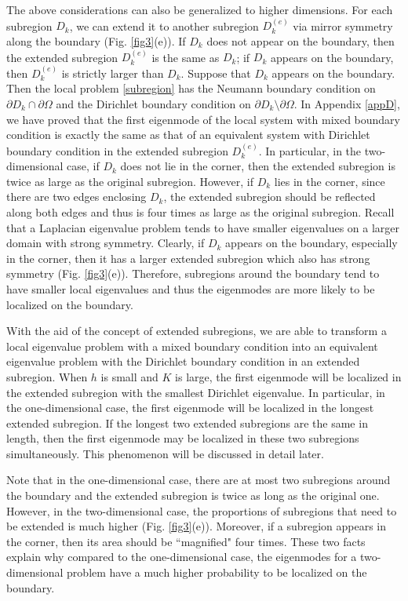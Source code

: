 \documentclass[a4paper,11pt]{article}
\begin{document}
The above considerations can also be generalized to higher dimensions. For each subregion $D_k$, we can extend it to another subregion $D_k^{(e)}$ via mirror symmetry along the boundary (Fig. \ref{fig3}(e)). If $D_k$ does not appear on the boundary, then the extended subregion $D_k^{(e)}$ is the same as $D_k$; if $D_k$ appears on the boundary, then $D_k^{(e)}$ is strictly larger than $D_k$. Suppose that $D_k$ appears on the boundary. Then the local problem \eqref{subregion} has the Neumann boundary condition on $\partial D_k \cap \partial \Omega$ and the Dirichlet boundary condition on $\partial D_k \setminus \partial \Omega$. In Appendix \ref{appD}, we have proved that the first eigenmode of the local system with mixed boundary condition is exactly the same as that of an equivalent system with Dirichlet boundary condition in the extended subregion $D_k^{(e)}$. In particular, in the two-dimensional case, if $D_k$ does not lie in the corner, then the extended subregion is twice as large as the original subregion. However, if $D_k$ lies in the corner, since there are two edges enclosing $D_k$, the extended subregion should be reflected along both edges and thus is four times as large as the original subregion. Recall that a Laplacian eigenvalue problem tends to have smaller eigenvalues on a larger domain with strong symmetry. Clearly, if $D_k$ appears on the boundary, especially in the corner, then it has a larger extended subregion which also has strong symmetry (Fig. \ref{fig3}(e)). Therefore, subregions around the boundary tend to have smaller local eigenvalues and thus the eigenmodes are more likely to be localized on the boundary.

With the aid of the concept of extended subregions, we are able to transform a local eigenvalue problem with a mixed boundary condition into an equivalent eigenvalue problem with the Dirichlet boundary condition in an extended subregion. When $h$ is small and $K$ is large, the first eigenmode will be localized in the extended subregion with the smallest Dirichlet eigenvalue. In particular, in the one-dimensional case, the first eigenmode will be localized in the longest extended subregion. If the longest two extended subregions are the same in length, then the first eigenmode may be localized in these two subregions simultaneously. This phenomenon will be discussed in detail later.

Note that in the one-dimensional case, there are at most two subregions around the boundary and the extended subregion is twice as long as the original one. However, in the two-dimensional case, the proportions of subregions that need to be extended is much higher (Fig. \ref{fig3}(e)). Moreover, if a subregion appears in the corner, then its area should be ``magnified" four times. These two facts explain why compared to the one-dimensional case, the eigenmodes for a two-dimensional problem have a much higher probability to be localized on the boundary.
\end{document}
